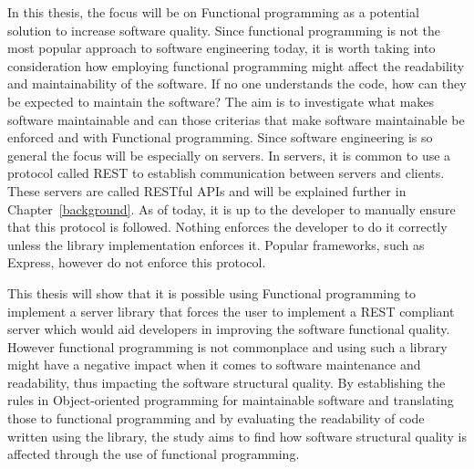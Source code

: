 In this thesis, the focus will be on Functional programming as a potential
solution to increase software quality. Since functional programming is not the
most popular approach to software engineering today, it is worth taking into
consideration how employing functional programming might affect the readability
and maintainability of the software. If no one understands the code, how can
they be expected to maintain the software? The aim is to investigate what makes
software maintainable and can those criterias that make software maintainable be
enforced and with Functional programming. Since software engineering is so
general the focus will be especially on servers. In servers, it is common to use
a protocol called REST to establish communication between servers and clients.
These servers are called RESTful APIs and will be explained further in
Chapter~\ref{background}. As of today, it is up to the developer to manually
ensure that this protocol is followed. Nothing enforces the developer to do it
correctly unless the library implementation enforces it.  Popular frameworks,
such as Express, however do not enforce this protocol.

This thesis will show that it is possible using Functional programming to
implement a server library that forces the user to implement a REST compliant
server which would aid developers in improving the software functional quality.
However functional programming is not commonplace and using such a library might
have a negative impact when it comes to software maintenance and readability,
thus impacting the software structural quality. By establishing the rules in
Object-oriented programming for maintainable software and translating those to
functional programming and by evaluating the readability of code written using
the library, the study aims to find how software structural quality is affected
through the use of functional programming.
